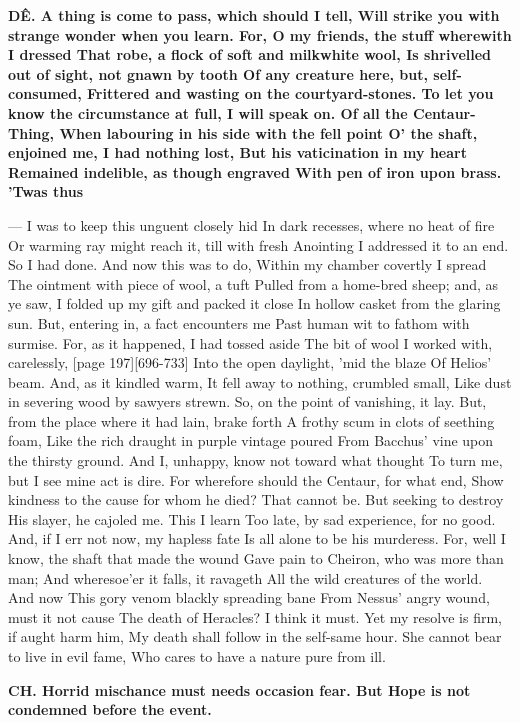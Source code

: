 \documentclass[11pt,letter]{book}
\begin{document}
\par \textbf{DÊ. A thing is come to pass, which should I tell, Will strike you with strange wonder when you learn. For, O my friends, the stuff wherewith I dressed That robe, a flock of soft and milkwhite wool, Is shrivelled out of sight, not gnawn by tooth Of any creature here, but, self-consumed, Frittered and wasting on the courtyard-stones. To let you know the circumstance at full, I will speak on. Of all the Centaur-Thing, When labouring in his side with the fell point O’ the shaft, enjoined me, I had nothing lost, But his vaticination in my heart Remained indelible, as though engraved With pen of iron upon brass. ’Twas thus}
\par  — I was to keep this unguent closely hid In dark recesses, where no heat of fire Or warming ray might reach it, till with fresh Anointing I addressed it to an end. So I had done. And now this was to do, Within my chamber covertly I spread The ointment with piece of wool, a tuft Pulled from a home-bred sheep; and, as ye saw, I folded up my gift and packed it close In hollow casket from the glaring sun. But, entering in, a fact encounters me Past human wit to fathom with surmise. For, as it happened, I had tossed aside The bit of wool I worked with, carelessly, [page 197][696-733] Into the open daylight, ’mid the blaze Of Helios’ beam. And, as it kindled warm, It fell away to nothing, crumbled small, Like dust in severing wood by sawyers strewn. So, on the point of vanishing, it lay. But, from the place where it had lain, brake forth A frothy scum in clots of seething foam, Like the rich draught in purple vintage poured From Bacchus’ vine upon the thirsty ground. And I, unhappy, know not toward what thought To turn me, but I see mine act is dire. For wherefore should the Centaur, for what end, Show kindness to the cause for whom he died? That cannot be. But seeking to destroy His slayer, he cajoled me. This I learn Too late, by sad experience, for no good. And, if I err not now, my hapless fate Is all alone to be his murderess. For, well I know, the shaft that made the wound Gave pain to Cheiron, who was more than man; And wheresoe’er it falls, it ravageth All the wild creatures of the world. And now This gory venom blackly spreading bane From Nessus’ angry wound, must it not cause The death of Heracles? I think it must. Yet my resolve is firm, if aught harm him, My death shall follow in the self-same hour. She cannot bear to live in evil fame, Who cares to have a nature pure from ill.

\par \textbf{CH. Horrid mischance must needs occasion fear. But Hope is not condemned before the event.}
\par 
\end{document}
